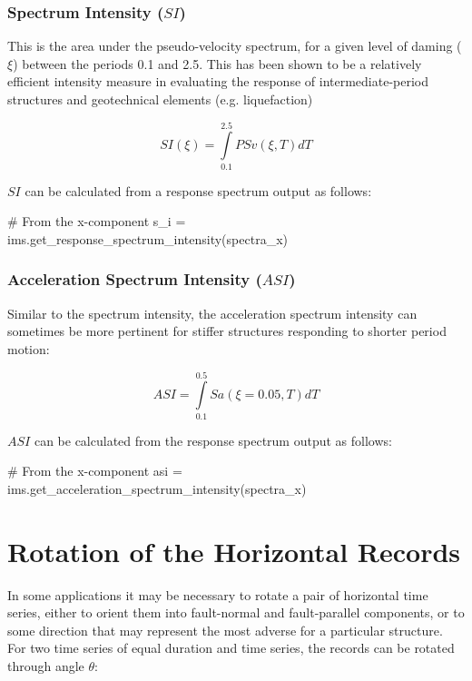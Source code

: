\subsubsection{Spectrum Intensity ($SI$)}

This is the area under the pseudo-velocity spectrum, for a given level of daming ($\xi$) between the periods 0.1 and 2.5. This has been shown to be a relatively efficient intensity measure in evaluating the response of intermediate-period structures and geotechnical elements (e.g. liquefaction)

\begin{equation}
SI \left( {\xi} \right) = \int\limits_{0.1}^{2.5} PSv \left( {\xi, T} \right) dT
\end{equation}

$SI$ can be calculated from a response spectrum output as follows:

\begin{python}
# From the x-component
s_i = ims.get_response_spectrum_intensity(spectra_x)
\end{python}

\subsubsection{Acceleration Spectrum Intensity ($ASI$)}

Similar to the spectrum intensity, the acceleration spectrum intensity can sometimes be more pertinent for stiffer structures responding to shorter period motion:

\begin{equation}
ASI = \int\limits_{0.1}^{0.5} Sa \left( {\xi=0.05, T} \right) dT
\end{equation}

$ASI$ can be calculated from the response spectrum output as follows:

\begin{python}
# From the x-component
asi = ims.get_acceleration_spectrum_intensity(spectra_x)
\end{python}


\section{Rotation of the Horizontal Records}

In some applications it may be necessary to rotate a pair of horizontal time series, either to orient them into fault-normal and fault-parallel components, or to some direction that may represent the most adverse for a particular structure. For two time series of equal duration and time series, the records can be rotated through angle $\theta$:


